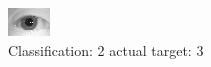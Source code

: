 \begin{figure}[h!]
\begin{center}
\includegraphics[width=0.60\columnwidth]{figures/ID1167_class_2_target_3.png}
\end{center}
\caption{ Classification: 2 actual target: 3}
\label{fig:ID1167_class_2_target_3}
\end{figure}
